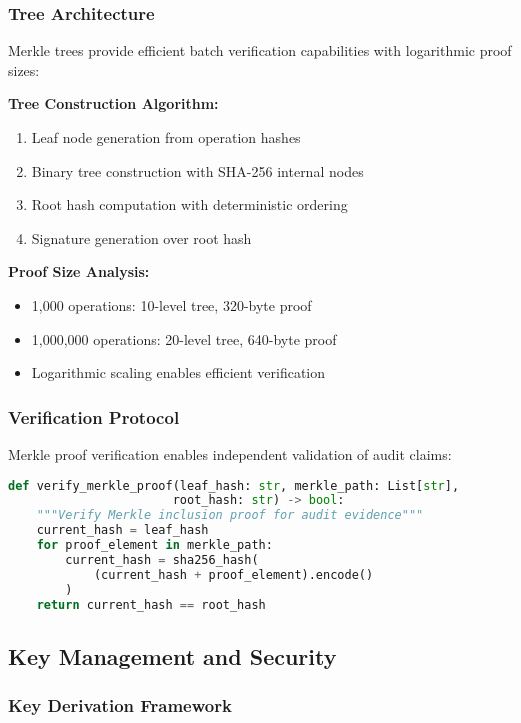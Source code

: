 \documentclass[12pt,a4paper]{article}
\begin{document}
\subsubsection{Tree Architecture}

Merkle trees provide efficient batch verification capabilities with logarithmic proof sizes:

\textbf{Tree Construction Algorithm:}
\begin{enumerate}
\item Leaf node generation from operation hashes
\item Binary tree construction with SHA-256 internal nodes
\item Root hash computation with deterministic ordering
\item Signature generation over root hash
\end{enumerate}

\textbf{Proof Size Analysis:}
\begin{itemize}
\item 1,000 operations: 10-level tree, 320-byte proof
\item 1,000,000 operations: 20-level tree, 640-byte proof
\item Logarithmic scaling enables efficient verification
\end{itemize}

\subsubsection{Verification Protocol}

Merkle proof verification enables independent validation of audit claims:

\begin{lstlisting}[language=Python, caption=Merkle Proof Verification]
def verify_merkle_proof(leaf_hash: str, merkle_path: List[str], 
                       root_hash: str) -> bool:
    """Verify Merkle inclusion proof for audit evidence"""
    current_hash = leaf_hash
    for proof_element in merkle_path:
        current_hash = sha256_hash(
            (current_hash + proof_element).encode()
        )
    return current_hash == root_hash
\end{lstlisting}

\subsection{Key Management and Security}

\subsubsection{Key Derivation Framework}
\end{document}

